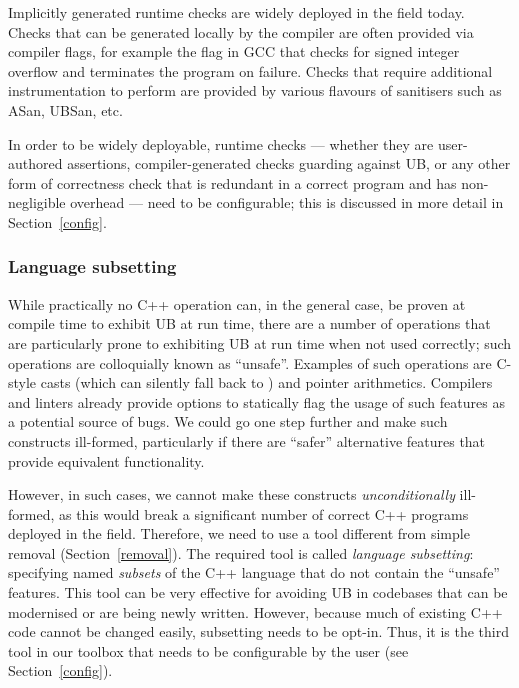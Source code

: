 {Implicitly generated runtime checks are widely deployed in the field today. Checks that can be generated locally by the compiler are often provided via compiler flags, for example the  flag in GCC that checks for signed integer overflow and terminates the program on failure. Checks that require additional instrumentation to perform are provided by various flavours of sanitisers such as ASan, UBSan, etc.

In order to be widely deployable, runtime checks --- whether they are user-authored assertions, compiler-generated checks guarding against UB, or any other form of correctness check that is redundant in a correct program and has non-negligible overhead --- need to be configurable; this is discussed in more detail in Section~\ref{config}.

\subsubsection{Language subsetting}
\label{subsetting}

While practically no C++ operation can, in the general case, be proven at compile time to exhibit UB at run time, there are a number of operations that are particularly prone to exhibiting UB at run time when not used correctly; such operations are colloquially known as ``unsafe''. Examples of such operations are C-style casts (which can silently fall back to ) and pointer arithmetics. Compilers and linters already provide options to statically flag the usage of such features as a potential source of bugs. We could go one step further and make such constructs ill-formed, particularly if there are ``safer'' alternative features that provide equivalent functionality. 

However, in such cases, we cannot make these constructs \emph{unconditionally} ill-formed, as this would break a significant number of correct C++ programs deployed in the field. Therefore, we need to use a tool different from simple removal (Section~\ref{removal}). The required tool is called \emph{language subsetting}: specifying named \emph{subsets} of the C++ language that do not contain the ``unsafe'' features. This tool can be very effective for avoiding UB in codebases that can be modernised or are being newly written. However, because much of existing C++ code cannot be changed easily, subsetting needs to be opt-in. Thus, it is the third tool in our toolbox that needs to be configurable by the user (see Section~\ref{config}).

}
